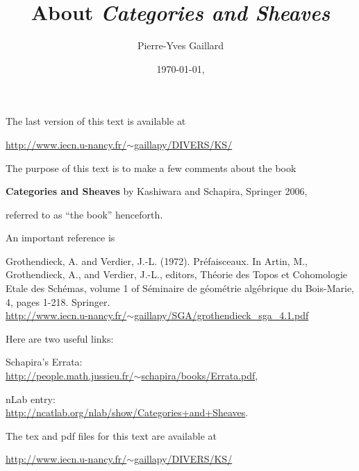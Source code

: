 \documentclass[12pt]{article}
\title{About \em{Categories and Sheaves}}
\author{Pierre-Yves Gaillard}
\date{\today, \currenttime}
\theoremstyle{remark}
\theoremstyle{definition}
\begin{document}
\maketitle

\noindent The last version of this text is available at

\noindent\href{http://www.iecn.u-nancy.fr/~gaillapy/DIVERS/KS/}{http://www.iecn.u-nancy.fr/$\sim$gaillapy/DIVERS/KS/}

\tableofcontents\newpage%

\noindent The purpose of this text is to make a few comments about the book%

\textbf{Categories and Sheaves} by Kashiwara and Schapira, Springer 2006,%

\noindent referred to as ``the book'' henceforth.%

An important reference is

\noindent[GV] Grothendieck, A. and Verdier, J.-L. (1972). Pr\'efaisceaux. In Artin, M., Grothendieck, A., and Verdier, J.-L., editors, Th\'eorie des Topos et Cohomologie Etale des Sch\'emas, volume 1 of S\'eminaire de g\'eom\'etrie alg\'ebrique du Bois-Marie, 4, pages 1-218. Springer. \\ 
\noindent\href{http://www.iecn.u-nancy.fr/~gaillapy/SGA/grothendieck_sga_4.1.pdf}{http://www.iecn.u-nancy.fr/$\sim$gaillapy/SGA/grothendieck\_sga\_4.1.pdf} 

Here are two useful links:

\noindent Schapira's Errata:\\ \href{http://people.math.jussieu.fr/~schapira/books/Errata.pdf}{http://people.math.jussieu.fr/$\sim$schapira/books/Errata.pdf},

\noindent nLab entry:\\ \href{http://ncatlab.org/nlab/show/Categories+and+Sheaves}{http://ncatlab.org/nlab/show/Categories+and+Sheaves}. 

The tex and pdf files for this text are available at 
 
\noindent\href{http://www.iecn.u-nancy.fr/~gaillapy/DIVERS/KS/}{http://www.iecn.u-nancy.fr/$\sim$gaillapy/DIVERS/KS/} 
 
 
\end{document}
